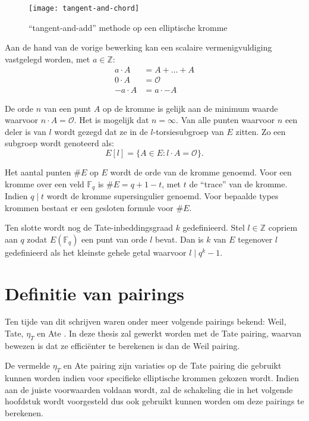 \begin{figure}[h]
	\centering
		\texttt{[image: tangent-and-chord]}
		\caption{``tangent-and-add'' methode op een elliptische kromme\label{figuur-pairings-tangent-and-chord}}
\end{figure}

Aan de hand van de vorige bewerking kan een scalaire vermenigvuldiging vastgelegd worden, met $a \in \mathbb{Z}$:
\[\begin{aligned}
a \cdot A	&= A + \ldots + A\\
0 \cdot A	&= \mathcal{O}\\
-a \cdot A	&= a \cdot -A
\end{aligned}\]

De orde $n$ van een punt $A$ op de kromme is gelijk aan de minimum waarde waarvoor $n \cdot A = \mathcal{O}$. Het is mogelijk dat $n = \infty$. Van alle punten waarvoor $n$ een deler is van $l$ wordt gezegd dat ze in de $l$-torsiesubgroep van $E$ zitten. Zo een subgroep wordt genoteerd als:
\[E[l] = \{ A \in E : l \cdot A = \mathcal{O} \}.\]

Het aantal punten $\#E$ op $E$ wordt de orde van de kromme genoemd. Voor een kromme over een veld $\mathbb{F}_q$ is $\#E = q + 1 - t$, met $t$ de ``trace'' van de kromme. Indien $q \mid t$ wordt de kromme supersingulier genoemd. Voor bepaalde types krommen bestaat er een gesloten formule voor $\#E$.

Ten slotte wordt nog de Tate-inbeddingsgraad $k$ gedefinieerd. Stel $l \in \mathbb{Z}$ copriem aan $q$ zodat $E(\mathbb{F}_q)$ een punt van orde $l$ bevat. Dan is $k$ van $E$ tegenover $l$ gedefinieerd als het kleinste gehele getal waarvoor $l \mid q^k - 1$.

\section{Definitie van pairings}

Ten tijde van dit schrijven waren onder meer volgende pairings bekend: Weil, Tate, $\eta_T$ \cite{eta} en Ate \cite{ate}. In deze thesis zal gewerkt worden met de Tate pairing, waarvan bewezen is dat ze effici\"enter te berekenen is dan de Weil pairing.

De vermelde $\eta_T$ en Ate pairing zijn variaties op de Tate pairing die gebruikt kunnen worden indien voor specifieke elliptische krommen gekozen wordt. Indien aan de juiste voorwaarden voldaan wordt, zal de schakeling die in het volgende hoofdstuk wordt voorgesteld dus ook gebruikt kunnen worden om deze pairings te berekenen.

